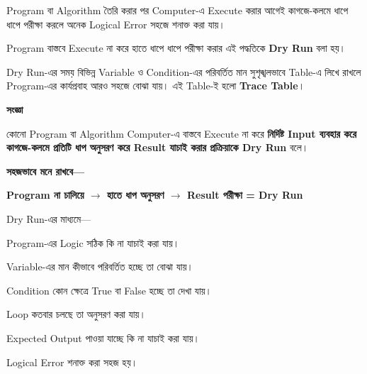 
Program বা Algorithm তৈরি করার পর Computer-এ Execute করার আগেই
কাগজে-কলমে ধাপে ধাপে পরীক্ষা করলে অনেক Logical Error সহজে
শনাক্ত করা যায়।

Program বাস্তবে Execute না করে হাতে ধাপে ধাপে পরীক্ষা করার
এই পদ্ধতিকে \textbf{Dry Run} বলা হয়।

Dry Run-এর সময় বিভিন্ন Variable ও Condition-এর পরিবর্তিত মান
সুশৃঙ্খলভাবে Table-এ লিখে রাখলে Program-এর কার্যপ্রবাহ আরও
সহজে বোঝা যায়। এই Table-ই হলো \textbf{Trace Table}।


\begin{definitionbox}

\textbf{\color{darkTeal}সংজ্ঞা}

কোনো Program বা Algorithm Computer-এ বাস্তবে Execute না করে
\textbf{নির্দিষ্ট Input ব্যবহার করে কাগজে-কলমে প্রতিটি ধাপ অনুসরণ
করে Result যাচাই করার প্রক্রিয়াকে Dry Run} বলে।

\end{definitionbox}

\textbf{সহজভাবে মনে রাখবে—}

\begin{center}

\textbf{
Program না চালিয়ে
\(\longrightarrow\)
হাতে ধাপ অনুসরণ
\(\longrightarrow\)
Result পরীক্ষা
=
Dry Run
}

\end{center}


Dry Run-এর মাধ্যমে—

\begin{compacttwocolpoints}

\item Program-এর Logic সঠিক কি না যাচাই করা যায়।

\item Variable-এর মান কীভাবে পরিবর্তিত হচ্ছে তা বোঝা যায়।

\item Condition কোন ক্ষেত্রে True বা False হচ্ছে তা দেখা যায়।

\item Loop কতবার চলছে তা অনুসরণ করা যায়।

\item Expected Output পাওয়া যাচ্ছে কি না যাচাই করা যায়।

\item Logical Error শনাক্ত করা সহজ হয়।

\end{compacttwocolpoints}

